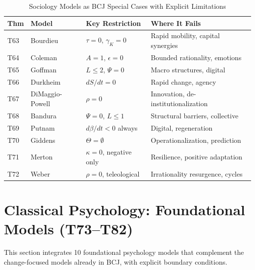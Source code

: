 \begin{table}[htbp]
\centering
\caption{Sociology Models as BCJ Special Cases with Explicit Limitations}
\label{tab:sociology-boundaries}
\renewcommand{\arraystretch}{1.2}
\begin{tabular}{@{}llp{4cm}p{4cm}@{}}
\toprule
\textbf{Thm} & \textbf{Model} & \textbf{Key Restriction} & \textbf{Where It Fails} \\
\midrule
T63 & Bourdieu & $\tau = 0$, $\gamma_K = 0$ & Rapid mobility, capital synergies \\
T64 & Coleman & $A = 1$, $\epsilon = 0$ & Bounded rationality, emotions \\
T65 & Goffman & $L \leq 2$, $\Psi = 0$ & Macro structures, digital \\
T66 & Durkheim & $dS/dt = 0$ & Rapid change, agency \\
T67 & DiMaggio-Powell & $\rho = 0$ & Innovation, de-institutionalization \\
T68 & Bandura & $\Psi = 0$, $L \leq 1$ & Structural barriers, collective \\
T69 & Putnam & $d\beta/dt < 0$ always & Digital, regeneration \\
T70 & Giddens & $\Theta = \emptyset$ & Operationalization, prediction \\
T71 & Merton & $\kappa = 0$, negative only & Resilience, positive adaptation \\
T72 & Weber & $\rho = 0$, teleological & Irrationality resurgence, cycles \\
\bottomrule
\end{tabular}
\end{table}



\section{Classical Psychology: Foundational Models (T73--T82)}
\label{sec:bcj-psychology-classical}

This section integrates 10 foundational psychology models that complement the change-focused models already in BCJ, with explicit boundary conditions.


